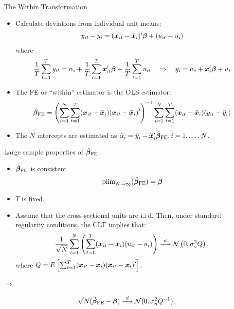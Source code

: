 \documentclass[english, professionalfonts,smaller,xcolor=dvipsnames]{beamer}
\begin{document}
\begin{frame}{The Within Transformation}
\begin{itemize}
\item Calculate deviations from individual unit means:
$$
y_{it}-\bar{y}_i = (\bm x_{it}-\bar{\bm x}_i)' \bm \beta + (u_{it}-\bar{u}_i )
$$
where
$$
\frac{1}{T}\sum_{t=1}^T y_{it} = \alpha_i + \frac{1}{T}\sum_{t=1}^T \bm x_{it}'\bm \beta + \frac{1}{T}\sum_{t=1}^T u_{it}
\quad \Rightarrow \quad \bar{y}_i = 
\alpha_i + \bar{\bm x}_i' \bm \beta + \bar{u}_i
$$
\vspace*{-\baselineskip}
\item The FE or ``within'' estimator is the OLS estimator:
$$
\hat{\bm \beta}_{\text{FE}} = \left(\sum_{i=1}^N \sum_{t=1}^T (\bm x_{it}-\bar{\bm x}_i ) (\bm x_{it}-\bar{\bm x}_i )' \right)^{-1} \sum_{i=1}^N \sum_{t=1}^T (\bm x_{it}-\bar{\bm x}_i )(y_{it}-\bar{y}_i )
$$

\item The $N$ intercepts are estimated as $\hat\alpha_i = \bar{y}_i - \bar{\bm x}_i' \hat{\bm \beta}_{\text{FE}},i=1,\ldots ,N$.
\end{itemize}

\end{frame}

\begin{frame}{Large sample properties of $\hat{\bm \beta}_{\text{FE}}$}

\begin{itemize}
\item $\hat{\bm \beta}_{\text{FE}}$ is consistent
$$
\operatorname{plim}_{N \rightarrow \infty}( \hat{\bm \beta}_{\text{FE}}) = \bm \beta
$$
\vspace*{-\baselineskip}
\item $T$ is fixed.


\item Assume that the cross-sectional units are i.i.d. Then, under standard regularity conditions, the CLT implies that:
\[
\frac{1}{\sqrt N}
\sum_{i=1}^N
\left(
\sum_{t=1}^T
(\bm x_{it}-\bar{\bm x}_i ) (u_{it}-\bar{u}_i )\right)
\overset{d}{\longrightarrow}
\mathcal{N} \left(0, \sigma_{u}^{2} Q \right),
\]
where
$
Q = E \left[ \sum_{t=1}^T (\bm x_{it}-\bar{\bm x}_i ) (\bm x_{it}-\bar{\bm x}_i )'
\right]$.
\end{itemize}

$\Rightarrow$

\[
\sqrt N(\hat{\bm \beta}_{\text{FE}}-\bm \beta)
\overset{d}{\longrightarrow}
\mathcal{N}(0, \sigma_{u}^{2} Q^{-1}),
\]

\end{frame}
\end{document}
